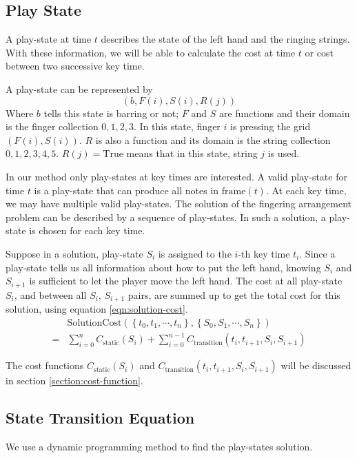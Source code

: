 \subsection{Play State}
A play-state at time $t$ describes the state of the left hand and the ringing strings. With these information, we will be able to calculate the cost at time $t$ or cost between two successive key time.

A play-state can be represented by \[ (b, F(i), S(i), R(j)) \] Where $b$ tells this state is barring or not; $F$ and $S$ are functions and their domain is the finger collection ${0, 1, 2, 3}$. In this state, finger $i$ is pressing the grid $(F(i), S(i))$. $R$ is also a function and its domain is the string collection ${0, 1, 2, 3, 4, 5}$. $R(j) = \mathrm{True}$ means that in this state, string $j$ is used.

In our method only play-states at key times are interested. 
A valid play-state for time $t$ is  a play-state that can produce all notes in $\mathrm{frame}(t)$. At each key time, we may have multiple valid play-states.  The solution of the fingering arrangement problem can be described by a sequence of play-states. In such a solution, a play-state is chosen for each key time. 

Suppose in a solution, play-state $S_i$ is assigned to the $i$-th key time $t_i$. Since a play-state tells us all information about how to put the left hand, knowing $S_i$ and $S_{i+1}$ is sufficient to let the player move the left hand. The cost at all play-state $S_i$, and between all $S_i$, $S_{i+1}$ pairs, are summed up to get the total cost for this solution, using equation \ref{eqn:solution-cost}.
\begin{eqnarray}
    & \mathrm{SolutionCost}(
        \left\{t_0, t_1, \cdots, t_n\right\}, \left\{S_0, S_1, \cdots, S_n\right\}
    )  \nonumber\\
    =& \sum_{i = 0}^n C_{\mathrm{static}}(S_i)
    + \sum_{i = 0}^{n - 1} C_{\mathrm{transition}}(t_i, t_{i+1}, S_i, S_{i+1})
    \label{eqn:solution-cost}
\end{eqnarray}

The cost functions $C_{\mathrm{static}}(S_i)$ and $C_{\mathrm{transition}}(t_i, t_{i+1}, S_i, S_{i+1})$ will be discussed in section \ref{section:cost-function}.

\subsection{State Transition Equation}
We use a dynamic programming method to find the play-states solution. 

